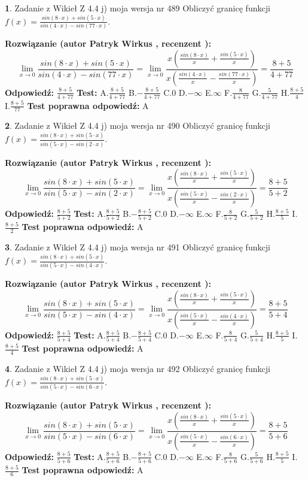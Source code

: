 \documentclass[12pt, a4paper]{article}
\theoremstyle{definition} %
\newtheorem{zad}{}
\newcommand{\zadStart}[1]{\begin{zad}#1\newline}
\newcommand{\zadStop}{\end{zad}}
\newcommand{\rozwStart}[2]{\noindent \textbf{Rozwiązanie (autor #1 , recenzent #2): }\newline}
\newcommand{\rozwStop}{\newline}
\newcommand{\odpStart}{\noindent \textbf{Odpowiedź:}\newline}
\newcommand{\odpStop}{\newline}
\newcommand{\testStart}{\noindent \textbf{Test:}\newline}
\newcommand{\testStop}{\newline}
\newcommand{\kluczStart}{\noindent \textbf{Test poprawna odpowiedź:}\newline}
\newcommand{\kluczStop}{\newline}
\begin{document}
\zadStart{Zadanie z Wikieł Z 4.4 j) moja wersja nr 489}
Obliczyć granicę funkcji $f(x)=\frac{sin(8\cdot x) +sin(5\cdot x)}{sin(4\cdot x) -sin(77\cdot x)}$.
\zadStop
\rozwStart{Patryk Wirkus}{}
$$\lim\limits_{x\to 0}\frac{sin(8\cdot x) +sin(5\cdot x)}{sin(4\cdot x) -sin(77\cdot x)}=\lim\limits_{x\to 0}\frac{x(\frac{sin(8\cdot x)}{x}+\frac{sin(5\cdot x)}{x})}{x(\frac{sin(4\cdot x)}{x}-\frac{sin(77\cdot x)}{x})}=\frac{8+5}{4+77}$$
\rozwStop
\odpStart
$\frac{8+5}{4+77}$
\odpStop
\testStart
A.$\frac{8+5}{4+77}$
B.$-\frac{8+5}{4+77}$
C.$0$
D.$-\infty$
E.$\infty$
F.$\frac{8}{4+77}$
G.$\frac{5}{4+77}$
H.$\frac{8+5}{4}$
I.$\frac{8+5}{77}$
\testStop
\kluczStart
A
\kluczStop



\zadStart{Zadanie z Wikieł Z 4.4 j) moja wersja nr 490}
Obliczyć granicę funkcji $f(x)=\frac{sin(8\cdot x) +sin(5\cdot x)}{sin(5\cdot x) -sin(2\cdot x)}$.
\zadStop
\rozwStart{Patryk Wirkus}{}
$$\lim\limits_{x\to 0}\frac{sin(8\cdot x) +sin(5\cdot x)}{sin(5\cdot x) -sin(2\cdot x)}=\lim\limits_{x\to 0}\frac{x(\frac{sin(8\cdot x)}{x}+\frac{sin(5\cdot x)}{x})}{x(\frac{sin(5\cdot x)}{x}-\frac{sin(2\cdot x)}{x})}=\frac{8+5}{5+2}$$
\rozwStop
\odpStart
$\frac{8+5}{5+2}$
\odpStop
\testStart
A.$\frac{8+5}{5+2}$
B.$-\frac{8+5}{5+2}$
C.$0$
D.$-\infty$
E.$\infty$
F.$\frac{8}{5+2}$
G.$\frac{5}{5+2}$
H.$\frac{8+5}{5}$
I.$\frac{8+5}{2}$
\testStop
\kluczStart
A
\kluczStop



\zadStart{Zadanie z Wikieł Z 4.4 j) moja wersja nr 491}
Obliczyć granicę funkcji $f(x)=\frac{sin(8\cdot x) +sin(5\cdot x)}{sin(5\cdot x) -sin(4\cdot x)}$.
\zadStop
\rozwStart{Patryk Wirkus}{}
$$\lim\limits_{x\to 0}\frac{sin(8\cdot x) +sin(5\cdot x)}{sin(5\cdot x) -sin(4\cdot x)}=\lim\limits_{x\to 0}\frac{x(\frac{sin(8\cdot x)}{x}+\frac{sin(5\cdot x)}{x})}{x(\frac{sin(5\cdot x)}{x}-\frac{sin(4\cdot x)}{x})}=\frac{8+5}{5+4}$$
\rozwStop
\odpStart
$\frac{8+5}{5+4}$
\odpStop
\testStart
A.$\frac{8+5}{5+4}$
B.$-\frac{8+5}{5+4}$
C.$0$
D.$-\infty$
E.$\infty$
F.$\frac{8}{5+4}$
G.$\frac{5}{5+4}$
H.$\frac{8+5}{5}$
I.$\frac{8+5}{4}$
\testStop
\kluczStart
A
\kluczStop



\zadStart{Zadanie z Wikieł Z 4.4 j) moja wersja nr 492}
Obliczyć granicę funkcji $f(x)=\frac{sin(8\cdot x) +sin(5\cdot x)}{sin(5\cdot x) -sin(6\cdot x)}$.
\zadStop
\rozwStart{Patryk Wirkus}{}
$$\lim\limits_{x\to 0}\frac{sin(8\cdot x) +sin(5\cdot x)}{sin(5\cdot x) -sin(6\cdot x)}=\lim\limits_{x\to 0}\frac{x(\frac{sin(8\cdot x)}{x}+\frac{sin(5\cdot x)}{x})}{x(\frac{sin(5\cdot x)}{x}-\frac{sin(6\cdot x)}{x})}=\frac{8+5}{5+6}$$
\rozwStop
\odpStart
$\frac{8+5}{5+6}$
\odpStop
\testStart
A.$\frac{8+5}{5+6}$
B.$-\frac{8+5}{5+6}$
C.$0$
D.$-\infty$
E.$\infty$
F.$\frac{8}{5+6}$
G.$\frac{5}{5+6}$
H.$\frac{8+5}{5}$
I.$\frac{8+5}{6}$
\testStop
\kluczStart
A
\kluczStop
\end{document}
